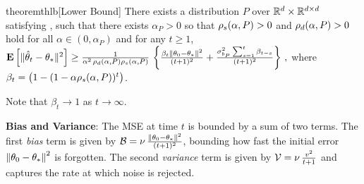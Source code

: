 \begin{restatable}{theorem}{thlb}[Lower Bound]\label{th:lb}
There exists a distribution $P$ over $\mathbb{R}^d\times \mathbb{R}^{d \times d}$ satisfying , such that
there exists $\alpha_P>0$ so that $\rho_s(\alpha,P)>0$ and $\rho_d(\alpha,P)>0$ hold for all $\alpha\in (0,\alpha_P)$ and
for any $t\ge 1$,  $\mathbf{E}\left[\| \hat{\theta}_t-\theta_*\|^2\right] 
\geq \frac{1}{\alpha^2 \, \rho_d(\alpha,P)\rho_s(\alpha,P)} \,\left\{ \frac{\beta_t \left\| \theta_0-\theta_*\right\|^2}{(t+1)^2} 
+ \frac{\sigma^2_{b_P}\sum_{s=1}^t \beta_{t-s}  }{(t+1)^2} \right\}\,,$
where $\beta_{t} =  \big(1-(1-\alpha \rho_s(\alpha,P))^t\big)$.
\end{restatable}
Note that $\beta_t \to 1$ as $t\to\infty$. 

\textbf{Bias and Variance}: The MSE at time $t$ is bounded by a sum of two terms. The first \emph{bias} term is given by $\mathcal{B}=\nu \,\frac{\left\| \theta_0-\theta_*\right\|^2}{(t+1)^2}$, bounding how fast the initial error $\left\| \theta_0-\theta_*\right\|^2$ is forgotten. The second \emph{variance} term is given by $\mathcal{V}=\nu\, \frac{v^2}{t+1} $ and captures the rate at which noise is rejected. 

